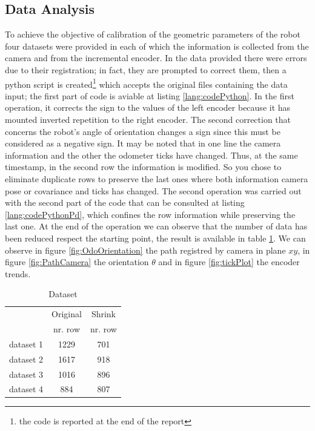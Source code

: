 \subsection{Data Analysis}
To achieve the objective of calibration of the geometric parameters of the robot four datasets were provided in each of which the information is collected from the camera and from the incremental encoder.
In the data provided there were errors due to their registration; in fact, they are prompted to correct them, then a python script is created\footnote{the code is reported at the end of the report} which accepts the original files containing the data input; the first part of code is aviable at listing \ref{lang:codePython}.
In the first operation, it corrects the sign to the values of the left encoder because it has mounted inverted repetition to the right encoder.
The second correction that concerns the robot's angle of orientation changes a sign since this must be considered as a negative sign.
It may be noted that in one line the camera information and the other the odometer ticks have changed. 
Thus, at the same timestamp, in the second row the information is modified.
So you chose to eliminate duplicate rows to preserve the last ones where both information camera pose or covariance and ticks has changed.
The second operation was carried out with the second part of the code that can be consulted at listing \ref{lang:codePythonPd}, which confines the row information while preserving the last one.
At the end of the operation we can observe that the number of data has been reduced respect the starting point, the result is available in table \ref{tab:dataset}.
We can observe in figure \ref{fig:OdoOrientation} the path registred by camera in plane $xy$, in figure \ref{fig:PathCamera} the orientation $\theta$ and in figure \ref{fig:tickPlot} the encoder trends.
\begin{table}[!htb]
\centering
\begin{tabular}{lcc}
\hline
			&	Original		&	Shrink\\
			&	nr. row		&	nr. row\\
\hline
dataset 1	&	1229			& 	701\\
dataset 2	&	1617			& 	918\\
dataset 3	&	1016			& 	896\\
dataset 4	&	884			& 	807\\
\hline
\end{tabular}
\caption{Dataset}
\label{tab:dataset}
\end{table}

